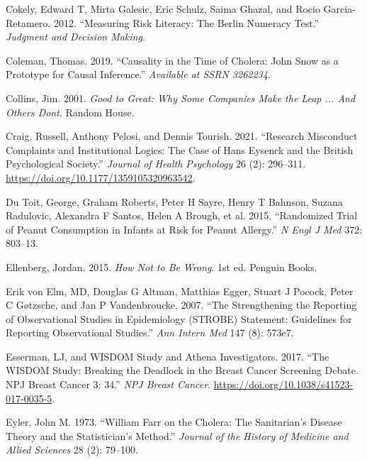 \documentclass[
  10pt,
  b5paper]{book}
\newlength{\cslhangindent}
\newlength{\cslentryspacingunit} %
\newenvironment{CSLReferences}[2] %
 {%
  \setlength{\parindent}{0pt}
  \ifodd #1
  \let\oldpar\par
  \def\par{\hangindent=\cslhangindent\oldpar}
  \fi
  \setlength{\parskip}{#2\cslentryspacingunit}
 }%
 {}
\begin{document}
\begin{CSLReferences}{1}{0}
\leavevmode{}%
Cokely, Edward T, Mirta Galesic, Eric Schulz, Saima Ghazal, and Rocio Garcia-Retamero. 2012. {``Measuring Risk Literacy: The Berlin Numeracy Test.''} \emph{Judgment and Decision Making}.

\leavevmode{}%
Coleman, Thomas. 2019. {``Causality in the Time of Cholera: John {S}now as a Prototype for Causal Inference.''} \emph{Available at SSRN 3262234}.

\leavevmode{}%
Collins, Jim. 2001. \emph{Good to Great: Why Some Companies Make the Leap ... And Others Dont}. Random House.

\leavevmode{}%
Craig, Russell, Anthony Pelosi, and Dennis Tourish. 2021. {``Research Misconduct Complaints and Institutional Logics: The Case of Hans Eysenck and the British Psychological Society.''} \emph{Journal of Health Psychology} 26 (2): 296--311. \url{https://doi.org/10.1177/1359105320963542}.

\leavevmode{}%
Du Toit, George, Graham Roberts, Peter H Sayre, Henry T Bahnson, Suzana Radulovic, Alexandra F Santos, Helen A Brough, et al. 2015. {``Randomized Trial of Peanut Consumption in Infants at Risk for Peanut Allergy.''} \emph{N Engl J Med} 372: 803--13.

\leavevmode{}%
Ellenberg, Jordan. 2015. \emph{How Not to Be Wrong}. 1st ed. Penguin Books.

\leavevmode{}%
Erik von Elm, MD, Douglas G Altman, Matthias Egger, Stuart J Pocock, Peter C Gøtzsche, and Jan P Vandenbroucke. 2007. {``The Strengthening the Reporting of Observational Studies in Epidemiology (STROBE) Statement: Guidelines for Reporting Observational Studies.''} \emph{Ann Intern Med} 147 (8): 573e7.

\leavevmode{}%
Esserman, LJ, and WISDOM Study and Athena Investigators. 2017. {``The WISDOM Study: Breaking the Deadlock in the Breast Cancer Screening Debate. NPJ Breast Cancer 3: 34.''} \emph{NPJ Breast Cancer}. \url{https://doi.org/10.1038/s41523-017-0035-5}.

\leavevmode{}%
Eyler, John M. 1973. {``William Farr on the Cholera: The Sanitarian's Disease Theory and the Statistician's Method.''} \emph{Journal of the History of Medicine and Allied Sciences} 28 (2): 79--100.


\end{CSLReferences}
\end{document}
